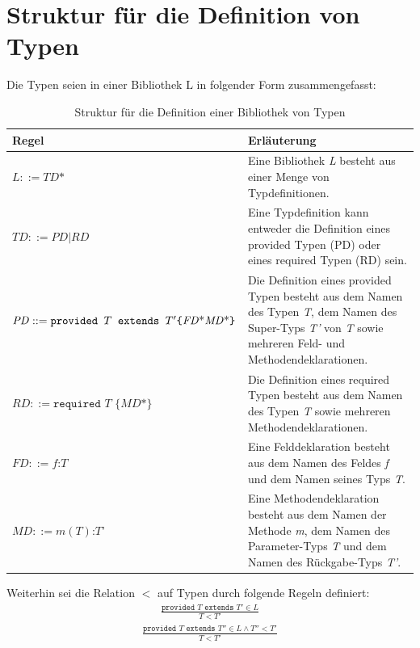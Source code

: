 \documentclass[a4paper,12pt]{article}
\begin{document}
\section{Struktur für die Definition von Typen}\label{sec:strukturTypen}
Die Typen seien in einer Bibliothek $\text{L}$ in folgender Form zusammengefasst:
\begin{table}[H]
\centering
\begin{tabular}{|p{5.5cm}|p{8.5cm}|}
\hline
\hline
\centering\textbf{Regel} & \textbf{Erläuterung} \\
\hline
\hline
$\mathit{L} ::= \mathit{TD}\text{*}$ & Eine Bibliothek \emph{L} besteht aus einer Menge von Typdefinitionen.\\
\hline
$\mathit{TD} ::= \mathit{PD} | \mathit{RD}$ & Eine Typdefinition kann entweder die Definition eines provided Typen (PD) oder eines required Typen (RD) sein.\\
\hline
$\mathit{PD} ::= \newline\texttt{provided }T \texttt{ extends } T' \newline  \texttt{\{} \mathit{FD}\text{*} \mathit{MD}\text{*}\texttt{\}}$& Die Definition eines provided Typen besteht aus dem Namen des Typen \emph{T}, dem Namen des Super-Typs \emph{T'} von \emph{T} sowie mehreren Feld- und Methodendeklarationen.\\
\hline
$\mathit{RD} ::= \texttt{required } T \texttt{ \{}\mathit{MD}\text{*}\texttt{\}}$ & Die Definition eines required Typen besteht aus dem Namen des Typen \emph{T} sowie mehreren Methodendeklarationen.\\
\hline
$\mathit{FD} ::= \mathit{f} \texttt{:} T$ & Eine Felddeklaration besteht aus dem Namen des Feldes \emph{f} und dem Namen seines Typs \emph{T}.\\
\hline
$\mathit{MD} ::= \mathit{m(T)}\texttt{:}\mathit{T}$' & Eine Methodendeklaration besteht aus dem Namen der Methode \emph{m}, dem Namen des Parameter-Typs \emph{T} und dem Namen des Rückgabe-Typs \emph{T'}.\\
\hline
\hline
\end{tabular}
\caption{Struktur für die Definition einer Bibliothek von Typen}
 \label{tab:eIShort}
\end{table}
\noindent
Weiterhin sei die Relation $<$ auf Typen durch folgende Regeln definiert:
\begin{gather*}
\frac{\texttt{provided }T \texttt{ extends } T' \in L}{T < T'}
\end{gather*}
\begin{gather*}
\frac{\texttt{provided } T \texttt{ extends } T'' \in L \wedge T'' < T'}{T < T'}
\end{gather*}
\end{document}
